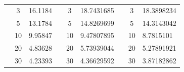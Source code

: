 \begin{table}[h]
\begin{tabular}{|cclcclccl|}
\rowcolor[HTML]{DAE8FC} 
\multicolumn{1}{|c|}{\cellcolor[HTML]{FFFFC7}}                                & \multicolumn{1}{c|}{\cellcolor[HTML]{DAE8FC}3}         & \multicolumn{1}{l|}{\cellcolor[HTML]{DAE8FC}16.1184}    & \multicolumn{1}{c|}{\cellcolor[HTML]{FFFFC7}}                                & \multicolumn{1}{c|}{\cellcolor[HTML]{DAE8FC}3}         & \multicolumn{1}{l|}{\cellcolor[HTML]{DAE8FC}18.7431685} & \multicolumn{1}{c|}{\cellcolor[HTML]{FFFFC7}}                                & \multicolumn{1}{c|}{\cellcolor[HTML]{DAE8FC}3}         & 18.3898234 \\ \cline{2-3} \cline{5-6} \cline{8-9} 
\rowcolor[HTML]{DDFDFF} 
\multicolumn{1}{|c|}{\cellcolor[HTML]{FFFFC7}}                                & \multicolumn{1}{c|}{\cellcolor[HTML]{DDFDFF}5}         & \multicolumn{1}{l|}{\cellcolor[HTML]{DDFDFF}13.1784}    & \multicolumn{1}{c|}{\cellcolor[HTML]{FFFFC7}}                                & \multicolumn{1}{c|}{\cellcolor[HTML]{DDFDFF}5}         & \multicolumn{1}{l|}{\cellcolor[HTML]{DDFDFF}14.8269699} & \multicolumn{1}{c|}{\cellcolor[HTML]{FFFFC7}}                                & \multicolumn{1}{c|}{\cellcolor[HTML]{DDFDFF}5}         & 14.3143042 \\ \cline{2-3} \cline{5-6} \cline{8-9} 
\rowcolor[HTML]{DAE8FC} 
\multicolumn{1}{|c|}{\cellcolor[HTML]{FFFFC7}}                                & \multicolumn{1}{c|}{\cellcolor[HTML]{DAE8FC}10}        & \multicolumn{1}{l|}{\cellcolor[HTML]{DAE8FC}9.95847}    & \multicolumn{1}{c|}{\cellcolor[HTML]{FFFFC7}}                                & \multicolumn{1}{c|}{\cellcolor[HTML]{DAE8FC}10}        & \multicolumn{1}{l|}{\cellcolor[HTML]{DAE8FC}9.47807895} & \multicolumn{1}{c|}{\cellcolor[HTML]{FFFFC7}}                                & \multicolumn{1}{c|}{\cellcolor[HTML]{DAE8FC}10}        & 8.7815101  \\ \cline{2-3} \cline{5-6} \cline{8-9} 
\rowcolor[HTML]{DDFDFF} 
\multicolumn{1}{|c|}{\cellcolor[HTML]{FFFFC7}}                                & \multicolumn{1}{c|}{\cellcolor[HTML]{DDFDFF}20}        & \multicolumn{1}{l|}{\cellcolor[HTML]{DDFDFF}4.83628}    & \multicolumn{1}{c|}{\cellcolor[HTML]{FFFFC7}}                                & \multicolumn{1}{c|}{\cellcolor[HTML]{DDFDFF}20}        & \multicolumn{1}{l|}{\cellcolor[HTML]{DDFDFF}5.73939044} & \multicolumn{1}{c|}{\cellcolor[HTML]{FFFFC7}}                                & \multicolumn{1}{c|}{\cellcolor[HTML]{DDFDFF}20}        & 5.27891921 \\ \cline{2-3} \cline{5-6} \cline{8-9} 
\rowcolor[HTML]{DAE8FC} 
\multicolumn{1}{|c|}{\cellcolor[HTML]{FFFFC7}}                                & \multicolumn{1}{c|}{\cellcolor[HTML]{DAE8FC}30}        & \multicolumn{1}{l|}{\cellcolor[HTML]{DAE8FC}4.23393}    & \multicolumn{1}{c|}{\cellcolor[HTML]{FFFFC7}}                                & \multicolumn{1}{c|}{\cellcolor[HTML]{DAE8FC}30}        & \multicolumn{1}{l|}{\cellcolor[HTML]{DAE8FC}4.36629592} & \multicolumn{1}{c|}{\cellcolor[HTML]{FFFFC7}}                                & \multicolumn{1}{c|}{\cellcolor[HTML]{DAE8FC}30}        & 3.87182862 \\ \cline{2-3} \cline{5-6} \cline{8-9} 

\end{tabular}
\end{table}
